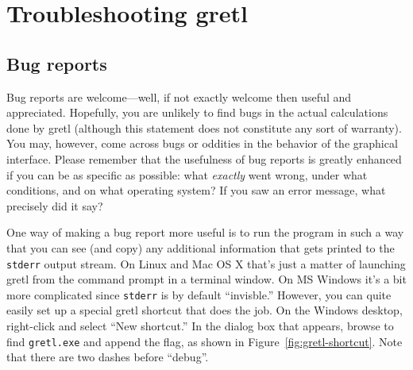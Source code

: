 \chapter{Troubleshooting gretl}
\label{trouble}

\section{Bug reports}
\label{trouble-bugs}

Bug reports are welcome---well, if not exactly welcome then useful
and appreciated. Hopefully, you are unlikely to find bugs in the
actual calculations done by gretl (although this statement does
not constitute any sort of warranty). You may, however, come across
bugs or oddities in the behavior of the graphical interface.  Please
remember that the usefulness of bug reports is greatly enhanced if you
can be as specific as possible: what \emph{exactly} went wrong, under
what conditions, and on what operating system?  If you saw an error
message, what precisely did it say?

One way of making a bug report more useful is to run the program in
such a way that you can see (and copy) any additional information that
gets printed to the \texttt{stderr} output stream. On Linux and Mac
OS X that's just a matter of launching gretl from the command
prompt in a terminal window. On MS Windows it's a bit more complicated
since \texttt{stderr} is by default ``invisble.'' However, you can
quite easily set up a special gretl shortcut that does the job.
On the Windows desktop, right-click and select ``New shortcut.'' In the
dialog box that appears, browse to find \texttt{gretl.exe} and
append the  flag, as shown in
Figure~\ref{fig:gretl-shortcut}.  Note that there are two dashes
before ``debug''.

